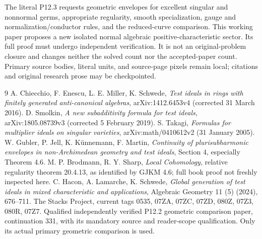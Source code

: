\documentclass[11pt]{article}
\begin{document}
The literal P12.3 requests geometric envelopes for excellent singular and
nonnormal germs, appropriate regularity, smooth specialization, gauge and
normalization/conductor rules, and the reduced-curve comparison. This
working paper proposes a new isolated normal algebraic positive-characteristic
sector. Its full proof must undergo independent verification. It is not an
original-problem closure and changes neither the solved count nor the
accepted-paper count. Primary source bodies, literal units, and source-page
pixels remain local; citations and original research prose may be checkpointed.

\begin{thebibliography}{9}
 A. Chiecchio, F. Enescu, L. E. Miller, K. Schwede,
\emph{Test ideals in rings with finitely generated anti-canonical algebras},
arXiv:1412.6453v4 (corrected 31 March 2016).
 D. Smolkin, \emph{A new subadditivity formula for test ideals},
arXiv:1805.08739v3 (corrected 5 February 2019).
 S. Takagi, \emph{Formulas for multiplier ideals on singular
varieties}, arXiv:math/0410612v2 (31 January 2005).
 W. Gubler, P. Jell, K. K\"unnemann, F. Martin,
\emph{Continuity of plurisubharmonic envelopes in non-Archimedean geometry
and test ideals}, Section 4, especially Theorem 4.6.
 M. P. Brodmann, R. Y. Sharp,
\emph{Local Cohomology}, relative regularity theorem 20.4.13,
as identified by GJKM 4.6; full book proof not freshly inspected here.
 C. Hacon, A. Lamarche, K. Schwede,
\emph{Global generation of test ideals in mixed characteristic and applications},
Algebraic Geometry 11 (5) (2024), 676--711.
 The Stacks Project, current tags
0535, 07ZA, 07ZC, 07ZD, 080Z, 07Z3, 080R, 07Z7.
 Qualified independently verified P12.2 geometric comparison
paper, continuation 331, with its mandatory source and reader-scope
qualification. Only its actual primary geometric comparison is used.
\end{thebibliography}
\end{document}
